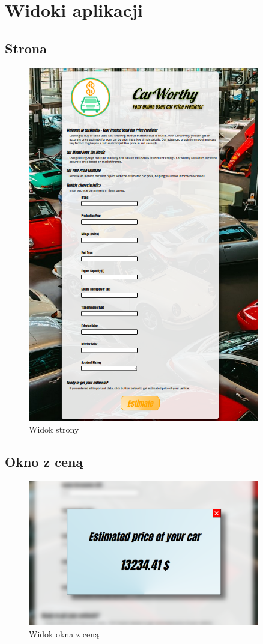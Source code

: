 \documentclass[12pt, a4paper]{report}
\begin{document}
\section{Widoki aplikacji}
\subsection{Strona}
\begin{figure}[H]
    \centering
    \includegraphics[width=0.9\textwidth]{images/page_view}
    \caption{Widok strony}
\end{figure}
\subsection{Okno z ceną}
\begin{figure}[H]
    \centering
    \includegraphics[width=0.9\textwidth]{images/price_view}
    \caption{Widok okna z ceną}
\end{figure}
\end{document}
